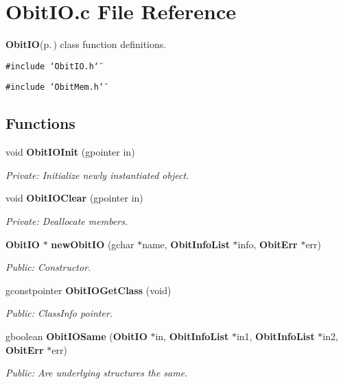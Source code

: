 \section{Obit\-IO.c File Reference}
\label{ObitIO_8c}
{\bf Obit\-IO}{\rm (p.\,\pageref{structObitIO})} class function definitions. 

{\tt \#include \char`\"{}Obit\-IO.h\char`\"{}}\par
{\tt \#include \char`\"{}Obit\-Mem.h\char`\"{}}\par
\subsection*{Functions}
\begin{CompactItemize}
\item 
void {\bf Obit\-IOInit} (gpointer in)
\begin{CompactList}\small\item\em Private: Initialize newly instantiated object. \item\end{CompactList}\item 
void {\bf Obit\-IOClear} (gpointer in)
\begin{CompactList}\small\item\em Private: Deallocate members. \item\end{CompactList}\item 
{\bf Obit\-IO} $\ast$ {\bf new\-Obit\-IO} (gchar $\ast$name, {\bf Obit\-Info\-List} $\ast$info, {\bf Obit\-Err} $\ast$err)
\begin{CompactList}\small\item\em Public: Constructor. \item\end{CompactList}\item 
gconstpointer {\bf Obit\-IOGet\-Class} (void)
\begin{CompactList}\small\item\em Public: Class\-Info pointer. \item\end{CompactList}\item 
gboolean {\bf Obit\-IOSame} ({\bf Obit\-IO} $\ast$in, {\bf Obit\-Info\-List} $\ast$in1, {\bf Obit\-Info\-List} $\ast$in2, {\bf Obit\-Err} $\ast$err)
\begin{CompactList}\small\item\em Public: Are underlying structures the same. \item\end{CompactList}\item 

\end{CompactItemize}
